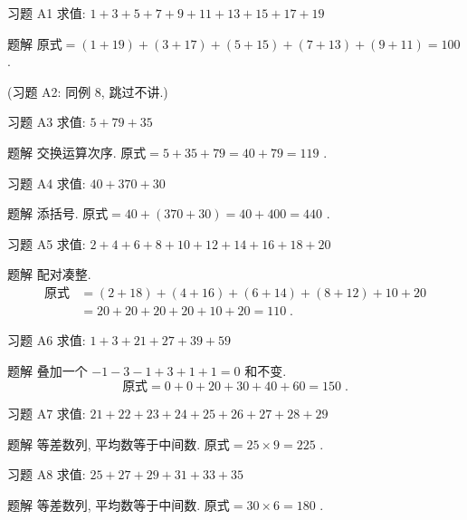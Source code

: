 \documentclass[content.tex]{subfiles}
\begin{document}
\begin{frame}{习题 A1}
求值: $1+3+5+7+9+11+13+15+17+19$
\begin{exampleblock}{题解}
$\text{原式}=(1+19)+(3+17)+(5+15)+(7+13)+(9+11)=100$.
\end{exampleblock}
\bigbreak
\centering (习题 A2: 同例 8, 跳过不讲.)
\end{frame}

\begin{frame}{习题 A3}
求值: $5+79+35$
\begin{exampleblock}{题解}
交换运算次序. $\text{原式} = 5+35+79 = 40+79 = 119$ .
\end{exampleblock}
\end{frame}

\begin{frame}{习题 A4}
求值: $40+370+30$
\begin{exampleblock}{题解}
添括号. $\text{原式} = 40+(370+30) = 40+400 = 440$ .
\end{exampleblock}
\end{frame}

\begin{frame}{习题 A5}
求值: $2+4+6+8+10+12+14+16+18+20$
\begin{exampleblock}{题解}
配对凑整.
\begin{align*}
\text{原式} &= (2+18)+(4+16)+(6+14)+(8+12)+10+20 \\
&= 20+20+20+20+10+20=110\;.
\end{align*}
\end{exampleblock}
\end{frame}

\begin{frame}{习题 A6}
求值: $1+3+21+27+39+59$
\begin{exampleblock}{题解}
叠加一个 $-1-3-1+3+1+1=0$ 和不变.
$$\text{原式} = 0+0+20+30+40+60 =150\;.$$
\end{exampleblock}
\end{frame}

\begin{frame}{习题 A7}
求值: $21+22+23+24+25+26+27+28+29$
\begin{exampleblock}{题解}
等差数列, 平均数等于中间数. $\text{原式} = 25\times 9 = 225$ .
\end{exampleblock}
\end{frame}

\begin{frame}{习题 A8}
求值: $25+27+29+31+33+35$
\begin{exampleblock}{题解}
等差数列, 平均数等于中间数. $\text{原式} = 30\times 6 = 180$ .
\end{exampleblock}
\end{frame}
\end{document}
